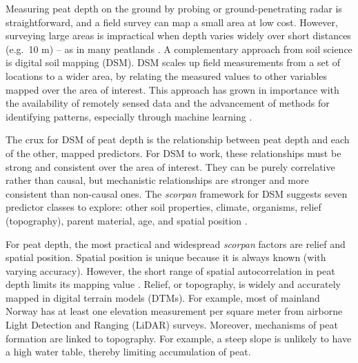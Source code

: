 \documentclass[soil, manuscript]{copernicus}
\begin{document}
Measuring peat depth on the ground by probing or ground-penetrating radar is straightforward, and a field survey can map a small area at low cost.
However, surveying large areas is impractical when depth varies widely over short distances (e.g.~10 m) -- as in many peatlands \citep{torppaStatisticalApproachDetermining2011, proulx-mcinnisReviewGroundpenetratingRadar2013, henrionMappingMonitoringPeatlands2024}.
A complementary approach from soil science is digital soil mapping (DSM).
DSM scales up field measurements from a set of locations to a wider area, by relating the measured values to other variables mapped over the area of interest.
This approach has grown in importance with the availability of remotely sensed data and the advancement of methods for identifying patterns, especially through machine learning \citep{minasnyDigitalMappingPeatlands2019, wadouxMachineLearningDigital2020}.

The crux for DSM of peat depth is the relationship between peat depth and each of the other, mapped predictors.
For DSM to work, these relationships must be strong and consistent over the area of interest.
They can be purely correlative rather than causal, but mechanistic relationships are stronger and more consistent than non-causal ones.
The \emph{scorpan} framework for DSM suggests seven predictor classes to explore: other soil properties, climate, organisms, relief (topography), parent material, age, and spatial position \citep{mcbratneyDigitalSoilMapping2003}.

For peat depth, the most practical and widespread \emph{scorpan} factors are relief and spatial position.
Spatial position is unique because it is always known (with varying accuracy).
However, the short range of spatial autocorrelation in peat depth limits its mapping value \citep{henglGenericFrameworkSpatial2004}.
Relief, or topography, is widely and accurately mapped in digital terrain models (DTMs).
For example, most of mainland Norway has at least one elevation measurement per square meter from airborne Light Detection and Ranging (LiDAR) surveys.
Moreover, mechanisms of peat formation are linked to topography.
For example, a steep slope is unlikely to have a high water table, thereby limiting accumulation of peat.
\end{document}
